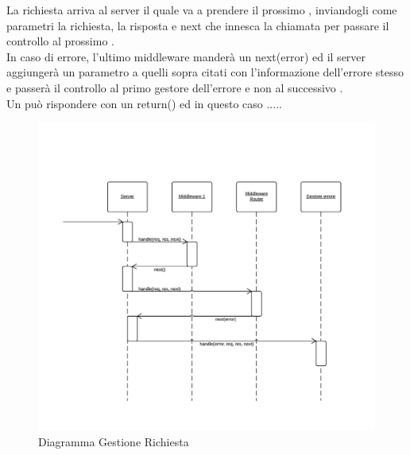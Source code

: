 La richiesta arriva al server il quale va a prendere il prossimo , inviandogli come parametri la richiesta, la risposta e next che innesca la chiamata per passare il controllo al prossimo .  \\
In caso di errore, l'ultimo middleware manderà un next(error) ed il server aggiungerà un parametro a quelli sopra citati con l'informazione dell'errore stesso e passerà il controllo al primo gestore dell'errore e non al successivo . \\
Un  può rispondere con un return() ed in questo caso ..... %

\begin{figure}[H]
	\begin{center} 
		\includegraphics[scale=0.30]{scenari/Diagramma Gestione Richiesta.png}  
		\caption{Diagramma Gestione Richiesta}
	\end{center} 
\end{figure} 

